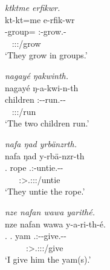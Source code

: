 \begin{exe}
\ex
\label{ex148}
\begin{xlist}
	\ex \textit{ktktme erfikwr.}\\
	\glll kt-kt=me e-rfik-wr\\
	 \Redup{}-group=\Ins{} \Stnsg{}:\Alph{}-grow.\Ext{}-\Ndu{}\\
	 ~ {\Stpl:\Sbj:\Nonpast:\Ipfv/grow}\\
	\trans `They grow in groups.'
	\label{ex149}

	\ex \textit{nagayé ŋakwinth.}\\
	\glll nagayé ŋ-a-kwi-n-th\\
	 children \M{}:\Alph{}-\Vc{}-run.\Ext{}-\Du{}-\Stnsg{}\\
	  ~ {\Stdu:\Sbj:\Nonpast:\Ipfv/run}\\
	\trans `The two children run.'
	\label{ex150}

	\ex \textit{nafa ŋad yrbänzrth.}\\
	\glll nafa ŋad y-rbä-nzr-th\\
	 \Tnsg{}.\Erg{} rope \Tsg.\Masc:\Alph{}-untie.\Ext{}-\Ndu{}-\Stnsg{}\\
	  ~ ~ {\Stpl:\Sbj>\Tsg.\Masc:\Obj:\Nonpast:\Ipfv/untie}\\
	\trans `They untie the rope.'
	\label{ex151}

	\ex \textit{nze nafan wawa yarithé.}\\
	\glll nze nafan wawa y-a-ri-th-é.\\
	 \Fsg{}.\Erg{} \Tsg.\Dat{} yam \Tsg{}.\Masc:\Alph{}-\Vc-give.\Ext{}-\Ndu{}-\Fsg{}\\
	  ~ ~ ~ {\Fsg:\Sbj>\Tsg.\Masc:\Io:\Nonpast:\Ipfv/give}\\
	\trans `I give him the yam(s).'
	\label{ex152}
\end{xlist}
\end{exe}

